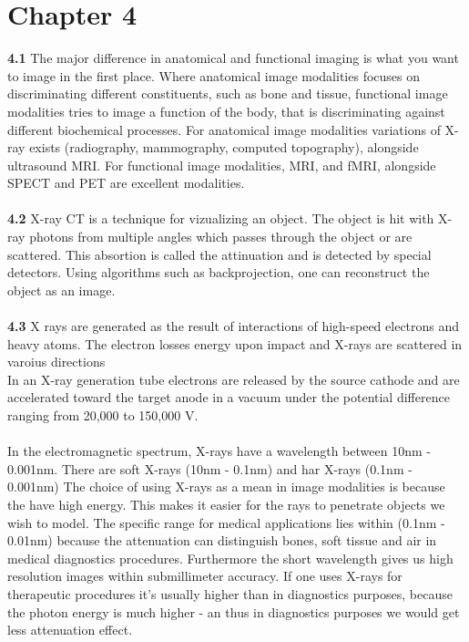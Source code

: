 \documentclass[]{article}
\begin{document}
\newpage
\section{Chapter 4}
\textbf{4.1} The major difference in anatomical and functional imaging is what you want to image in the first place. Where anatomical image modalities focuses on discriminating different constituents, such as bone and tissue, functional image modalities tries to image a function of the body, that is discriminating against different biochemical processes. For anatomical image modalities variations of X-ray exists (radiography, mammography, computed topography), alongside ultrasound MRI. For functional image modalities, MRI, and fMRI, alongside SPECT and PET are excellent modalities.\\\\
\textbf{4.2} X-ray CT is a technique for vizualizing an object. The object is hit with X-ray photons from multiple angles which passes through the object or are scattered. This absortion is called the attinuation and is detected by special detectors. Using algorithms such as backprojection, one can reconstruct the object as an image.\\\\
\textbf{4.3} X rays are generated as the result of interactions of high-speed electrons and heavy atoms. The electron losses energy upon impact and X-rays are scattered in varoius directions\\
In an X-ray generation tube electrons are released by the source cathode
and are accelerated toward the target anode in a vacuum under the potential difference ranging from 20,000 to 150,000 V.\\\\
In the electromagnetic spectrum, X-rays have a wavelength between 10nm - 0.001nm. There are soft X-rays (10nm - 0.1nm) and har X-rays (0.1nm - 0.001nm) The choice of using X-rays as a mean in image modalities is because the have high energy. This makes it easier for the rays to penetrate objects we wish to model. The specific range for medical applications lies within (0.1nm - 0.01nm) because the attenuation can distinguish bones, soft tissue and air in medical diagnostics procedures. Furthermore the short wavelength gives us high resolution images within submillimeter accuracy. If one uses X-rays for therapeutic procedures it's usually higher than in diagnostics purposes, because the photon energy is much higher - an thus in diagnostics purposes we would get less attenuation effect.\\\\
\end{document}
